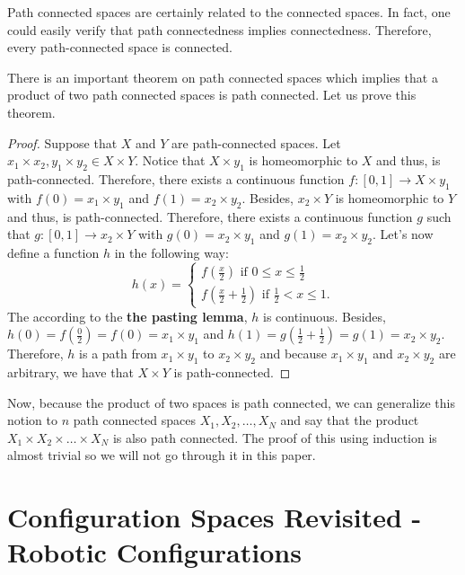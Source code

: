 \documentclass[12pt]{article}
\theoremstyle{definition}
\begin{document}
Path connected spaces are certainly related to the connected spaces.
\cite{10} In fact, one could easily verify that path connectedness implies connectedness.
Therefore, every path-connected space is connected.

\bigskip

There is an important theorem on path connected spaces which implies that a product of two path connected spaces is path connected.
Let us prove this theorem.

\begin{proof}
Suppose that $X$ and $Y$ are path-connected spaces.
Let $x_1 \times x_2, y_1 \times y_2 \in X \times Y$.
Notice that $X \times y_1$ is homeomorphic to $X$
and thus, is path-connected. Therefore, there exists
a continuous function $f : [0, 1] \to X \times y_1$
with $f(0) = x_1 \times y_1$ and $f(1) = x_2 \times y_2$.
Besides, $x_2 \times Y$ is homeomorphic to $Y$ and thus,
is path-connected. Therefore, there exists a continuous
function $g$ such that $g : [0, 1] \to x_2 \times Y$
with $g(0) = x_2 \times y_1$ and $g(1) = x_2 \times y_2$.
Let's now define a function $h$ in the following way:
$$
h(x) = 
\begin{cases}
f(\frac{x}{2}) \mbox{ if } 0 \leq x \leq \frac{1}{2}\\
f(\frac{x}{2} + \frac{1}{2}) \mbox{ if } \frac{1}{2} < x \leq 1.
\end{cases}
$$
The according to the \cite{11} \textbf{the pasting lemma},
$h$ is continuous. Besides, $h(0) = f(\frac{0}{2}) = f(0) = x_1 \times y_1$
and $h(1) = g(\frac{1}{2} + \frac{1}{2}) = g(1) = x_2 \times y_2$.
Therefore, $h$ is a path from $x_1 \times y_1$ to $x_2 \times y_2$
and because $x_1 \times y_1$ and $x_2 \times y_2$ are arbitrary, we have that
$X \times Y$ is path-connected.
\end{proof}

Now, because the product of two spaces is path connected, we can generalize this
notion to $n$ path connected spaces $X_1, X_2, \dots, X_N$ and say that the product
$X_1 \times X_2 \times \dots \times X_N$ is also path connected. The proof of this
using induction is almost trivial so we will not go through it in this paper.


\section*{\centering Configuration Spaces Revisited - Robotic Configurations}
\end{document}
